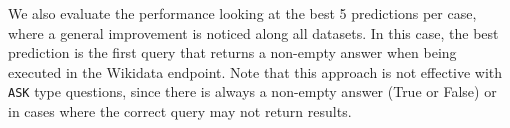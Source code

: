 We also evaluate the performance looking at the best 5 predictions per 
case, where a general improvement is noticed along all datasets. In this case, the best prediction 
is the first query that returns a non-empty answer when being executed in the Wikidata endpoint. 
Note that this approach is not effective with \texttt{ASK} type questions, since there is always a 
non-empty answer (True or False) or in cases where the correct query may not return results.

\begin{table}[h!]
    \centering
    \caption{Macro measure results for the Question Answering task.}
    \label{table:qakgMacroResults}
\end{table}

